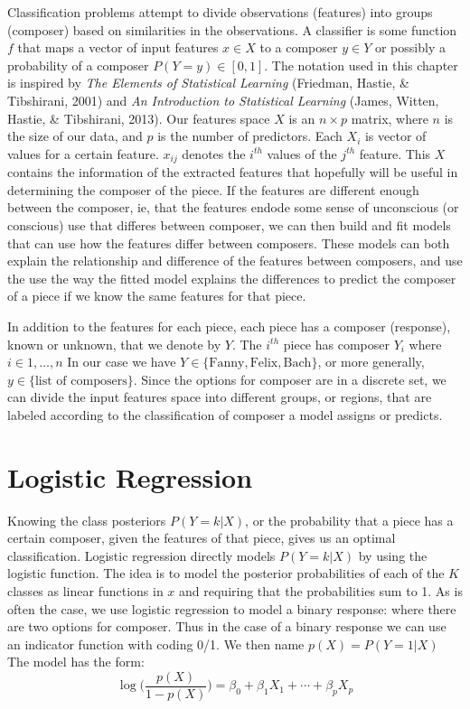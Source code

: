\documentclass[12pt,twoside]{reedthesis}
\theoremstyle{definition}
\theoremstyle{definition}
\theoremstyle{definition}
\theoremstyle{remark}
\begin{document}
Classification problems attempt to divide observations (features) into
groups (composer) based on similarities in the observations. A
classifier is some function \(f\) that maps a vector of input features
\(x \in X\) to a composer \(y \in Y\) or possibly a probability of a
composer \(P(Y = y) \in [0,1]\). The notation used in this chapter is
inspired by \emph{The Elements of Statistical Learning} (Friedman,
Hastie, \& Tibshirani, 2001) and \emph{An Introduction to Statistical
Learning} (James, Witten, Hastie, \& Tibshirani, 2013). Our features
space \(X\) is an \(n \times p\) matrix, where \(n\) is the size of our
data, and \(p\) is the number of predictors. Each \(X_i\) is vector of
values for a certain feature. \(x_{ij}\) denotes the \(i^{th}\) values
of the \(j^{th}\) feature. This \(X\) contains the information of the
extracted features that hopefully will be useful in determining the
composer of the piece. If the features are different enough between the
composer, ie, that the features endode some sense of unconscious (or
conscious) use that differes between composer, we can then build and fit
models that can use how the features differ between composers. These
models can both explain the relationship and difference of the features
between composers, and use the use the way the fitted model explains the
differences to predict the composer of a piece if we know the same
features for that piece.

In addition to the features for each piece, each piece has a composer
(response), known or unknown, that we denote by \(Y\). The \(i^{th}\)
piece has composer \(Y_i\) where \(i \in 1, \ldots, n\) In our case we
have \(Y \in \{\text{Fanny},\text{Felix}, \text{Bach}\}\), or more
generally, \(y \in \{\text{list of composers}\}\). Since the options for
composer are in a discrete set, we can divide the input features space
into different groups, or regions, that are labeled according to the
classification of composer a model assigns or predicts.

\section{Logistic Regression}\label{logistic-regression}

Knowing the class posteriors \(P(Y = k|X)\), or the probability that a
piece has a certain composer, given the features of that piece, gives us
an optimal classification. Logistic regression directly models
\(P(Y = k|X)\) by using the logistic function. The idea is to model the
posterior probabilities of each of the \(K\) classes as linear functions
in \(x\) and requiring that the probabilities sum to 1. As is often the
case, we use logistic regression to model a binary response: where there
are two options for composer. Thus in the case of a binary response we
can use an indicator function with coding 0/1. We then name
\(p(X) = P(Y=1|X)\) The model has the form:
\[ \log \bigg( \frac{p(X)}{1-p(X)} \bigg) = \beta_0 + \beta_1 X_1 + \cdots + \beta_pX_p\]
\end{document}
